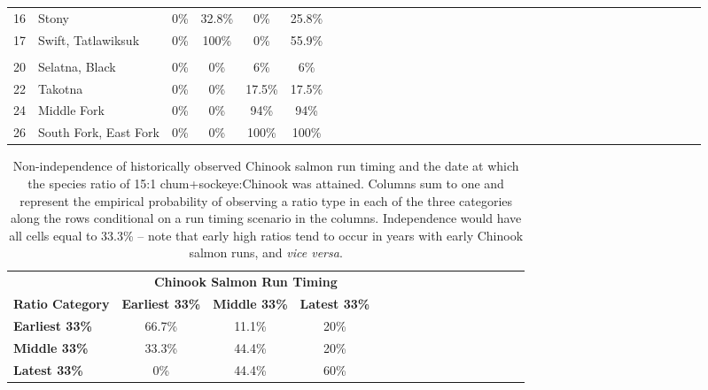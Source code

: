 \documentclass[12pt,]{book}
\theoremstyle{definition}
\theoremstyle{definition}
\theoremstyle{definition}
\theoremstyle{remark}
\begin{document}
\begin{longtable}[t]{clccccclccccclccccclccccclccccclcccc}
\hspace{1em}16 & Stony & 0\% & 32.8\% & 0\% & 25.8\%\\
\hspace{1em}17 & Swift, Tatlawiksuk & 0\% & 100\% & 0\% & 55.9\%\\
\addlinespace[0.3em]
\hline
\multicolumn{36}{l}{\textbf{Upper River}}\\
\hline
\hspace{1em}20 & Selatna, Black & 0\% & 0\% & 6\% & 6\%\\
\hspace{1em}22 & Takotna & 0\% & 0\% & 17.5\% & 17.5\%\\
\hspace{1em}24 & Middle Fork & 0\% & 0\% & 94\% & 94\%\\
\hspace{1em}26 & South Fork, East Fork & 0\% & 0\% & 100\% & 100\%\\
\bottomrule
\end{longtable}

\clearpage

\begin{table}

\caption{\label{tab:ratio-timing-cov-table}Non-independence of historically observed Chinook salmon run timing and the date at which the species ratio of 15:1 chum+sockeye:Chinook was attained. Columns sum to one and represent the empirical probability of observing a ratio type in each of the three categories along the rows conditional on a run timing scenario in the columns. Independence would have all cells equal to 33.3\% -- note that early high ratios tend to occur in years with early Chinook salmon runs, and \textit{vice versa}.}
\centering
\begin{tabular}[t]{>{\bfseries}lccclccclccclccc}
\toprule
\multicolumn{1}{c}{\bfseries } & \multicolumn{3}{c}{\bfseries Chinook Salmon Run Timing} \\
\cmidrule(l{2pt}r{2pt}){2-4}
\textbf{Ratio Category} & \textbf{Earliest 33\%} & \textbf{Middle 33\%} & \textbf{Latest 33\%}\\
\midrule
Earliest 33\% & 66.7\% & 11.1\% & 20\%\\
Middle 33\% & 33.3\% & 44.4\% & 20\%\\
Latest 33\% & 0\% & 44.4\% & 60\%\\
\bottomrule
\end{tabular}
\end{table}

\clearpage
\end{document}
